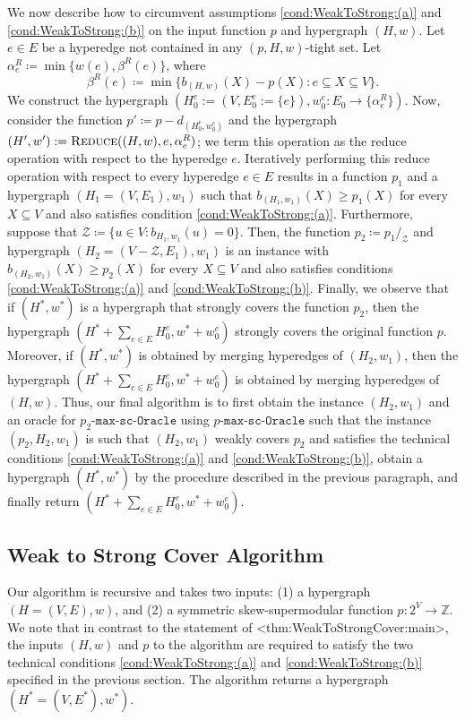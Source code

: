 \documentclass{article}
\def\Cref#1{<#1>}%
\newcommand{\zeros}{\ensuremath{\mathcal{Z}}\xspace}
\newcommand{\functionMaximizationOracleStrongCover}[1]{\ensuremath{{#1}\text{-}\mathtt{max}\text{-}\mathtt{sc}\text{-}\mathtt{Oracle}}\xspace}
\newcommand{\shubhang}[1]{{\color{blue}[{\tiny Shubhang: \bf #1}]\marginpar{\color{blue}*}}}
\newcommand{\kristof}[1]{{\color{purple}[{\tiny Kristof: \bf #1}]\marginpar{\color{red}*}}}
\newcommand{\functionContract}[2]{\ensuremath{{#1}/_{#2}}\xspace}
\newcommand{\reduce}{\ensuremath{\textsc{Reduce}}\xspace}
\providecommand{\Z}{\mathbb{Z}}
\begin{document}
We now describe how to circumvent assumptions \ref{cond:WeakToStrong:(a)} and \ref{cond:WeakToStrong:(b)} on the input function $p$ and hypergraph $(H,w)$. Let $e \in E$ be a hyperedge not contained in any $(p, H, w)$-tight set. Let $\alpha_e^R \coloneqq  \min\{w(e), \beta^R(e)\}$, where $$\beta^R(e) \coloneqq  \min\{b_{(H,w)}(X) - p(X) : e \subseteq X \subseteq V\}.$$
We construct the hypergraph $(H_0^e:=(V, E_0^e:=\{e\}), w_0^e:E_0\rightarrow \{\alpha^R_e\})$. Now, consider the function $p' \coloneqq  p - d_{(H_0^e, w_0^e)}$ and the  hypergraph $(H', w'):=\reduce((H, w), e, \alpha^R_e)$; we term this operation as the reduce operation with respect to the hyperedge $e$. 
Iteratively performing this reduce operation with respect to every hyperedge $e \in E$ results in a function $p_1$ and a hypergraph $(H_1 = (V, E_1), w_1)$ such that $b_{(H_1, w_1)}(X)\ge p_1(X)$ for every $X\subseteq V$ and also satisfies condition \ref{cond:WeakToStrong:(a)}. Furthermore, suppose that $\zeros \coloneqq  \{u \in V : b_{H_1, w_1}(u) = 0\}$. Then, the function $p_2 \coloneqq  \functionContract{p_1}{\zeros}$ and hypergraph $(H_2 = (V - \zeros, E_1), w_1)$ is an instance with $b_{(H_2, w_1)}(X)\ge p_2(X)$ for every $X\subseteq V$ and also satisfies conditions \ref{cond:WeakToStrong:(a)} and \ref{cond:WeakToStrong:(b)}. Finally, we observe that if $(H^*, w^*)$ is a hypergraph that strongly covers the function $p_2$, then the hypergraph $(H^*+\sum_{e \in E}H_0^e, w^*+w_0^e)$ strongly covers the original function $p$. Moreover,  if $(H^*, w^*)$ is obtained by merging hyperedges of $(H_2, w_1)$, then the  hypergraph $(H^*+\sum_{e \in E}H_0^e, w^*+w_0^e)$ is obtained by merging hyperedges of $(H, w)$. Thus, our final algorithm is to first obtain the instance $(H_2, w_1)$ and an oracle for \functionMaximizationOracleStrongCover{p_2} using \functionMaximizationOracleStrongCover{p} such that the instance $(p_2, H_2, w_1)$ is such that $(H_2, w_1)$ weakly covers $p_2$ and satisfies the technical conditions \ref{cond:WeakToStrong:(a)} and \ref{cond:WeakToStrong:(b)}, obtain a hypergraph $(H^*, w^*)$ by the procedure described in the previous paragraph, and finally return $(H^*+\sum_{e \in E}H_0^e, w^*+w_0^e)$. 

\subsection{Weak to Strong Cover Algorithm}\label{sec:WeakToStrongCover:Algorithm}
Our algorithm is recursive and takes two inputs: (1) a hypergraph $(H = (V, E), w)$, and (2) a symmetric skew-supermodular function $p:2^V \rightarrow\Z$. We note that in contrast to the statement of \Cref{thm:WeakToStrongCover:main}, the inputs $(H,w)$ and $p$ to the algorithm are required to satisfy the two technical conditions 
\ref{cond:WeakToStrong:(a)} and \ref{cond:WeakToStrong:(b)} specified in the previous section. The algorithm returns a hypergraph $\left(H^*= \left(V, E^*\right), w^*\right)$. 
\end{document}
